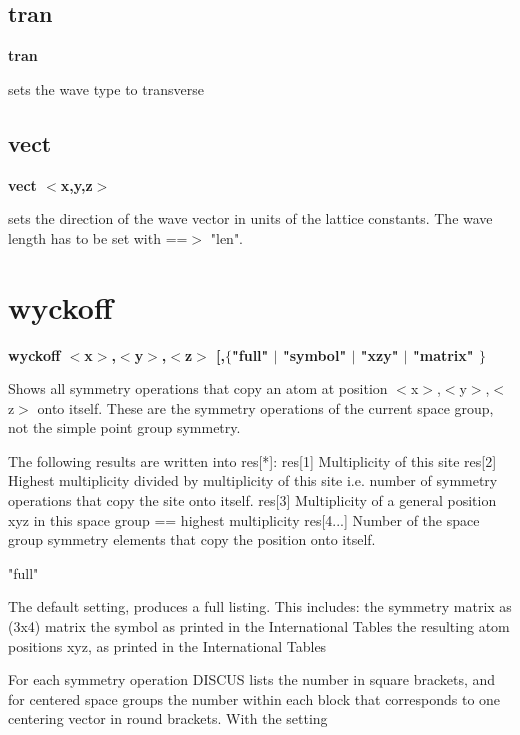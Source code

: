 \subsection*{tran}
{\bf tran \par }
\par
\vspace{3pt}
sets the wave type to transverse 
\subsection*{vect}
{\bf vect $ <$x,y,z$> $ \par }
\par
\vspace{3pt}
sets the direction of the wave vector in units of the lattice 
constants. The wave length has to be set with ==$> $ "len". 
\section{wyckoff}
{\bf wyckoff $ <$x$> $,$ <$y$> $,$ <$z$> $ [,$ \{$"full" $| $ "symbol" $| $ "xzy" $| $ "matrix" $\} $ \par }
\par
\vspace{3pt}
Shows all symmetry operations that copy an atom at position $ <$x$> $,$ <$y$> $,$ <$z$> $ 
onto itself. These are the symmetry operations of the current space group, 
not the simple point group symmetry. 
\par
The following results are written into res[*]: 
   res[1] Multiplicity of this site 
   res[2] Highest multiplicity divided by multiplicity of this site 
          i.e. number of symmetry operations that copy the site onto 
          itself. 
   res[3] Multiplicity of a general position xyz in this space group 
          == highest multiplicity 
   res[4...] Number of the space group symmetry elements that copy 
          the position onto itself. 
\par
\begin{MacVerbatim}
"full"
\end{MacVerbatim}
The default setting, produces a full listing. This includes: 
    the symmetry matrix as (3x4) matrix 
    the symbol as printed in the International Tables 
    the resulting atom positions xyz, as printed in the International Tables 
\par
For each symmetry operation DISCUS lists the number in square brackets, 
and for centered space groups the number within each block that corresponds 
to one centering vector in round brackets. With the setting 
